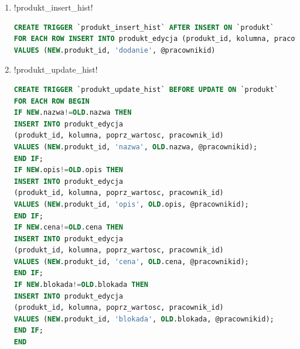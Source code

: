 \begin{enumerate}
\item \s!produkt_insert_hist!
\begin{lstlisting}[language=SQL]
CREATE TRIGGER `produkt_insert_hist` AFTER INSERT ON `produkt`
FOR EACH ROW INSERT INTO produkt_edycja (produkt_id, kolumna, pracownik_id)
VALUES (NEW.produkt_id, 'dodanie', @pracownikid)
\end{lstlisting}
\item \s!produkt_update_hist!
\begin{lstlisting}[language=SQL]
CREATE TRIGGER `produkt_update_hist` BEFORE UPDATE ON `produkt`
FOR EACH ROW BEGIN
IF NEW.nazwa!=OLD.nazwa THEN
INSERT INTO produkt_edycja 
(produkt_id, kolumna, poprz_wartosc, pracownik_id)
VALUES (NEW.produkt_id, 'nazwa', OLD.nazwa, @pracownikid);
END IF;
IF NEW.opis!=OLD.opis THEN
INSERT INTO produkt_edycja 
(produkt_id, kolumna, poprz_wartosc, pracownik_id)
VALUES (NEW.produkt_id, 'opis', OLD.opis, @pracownikid);
END IF;
IF NEW.cena!=OLD.cena THEN
INSERT INTO produkt_edycja 
(produkt_id, kolumna, poprz_wartosc, pracownik_id)
VALUES (NEW.produkt_id, 'cena', OLD.cena, @pracownikid);
END IF;
IF NEW.blokada!=OLD.blokada THEN
INSERT INTO produkt_edycja 
(produkt_id, kolumna, poprz_wartosc, pracownik_id)
VALUES (NEW.produkt_id, 'blokada', OLD.blokada, @pracownikid);
END IF;
END
\end{lstlisting}
\end{enumerate}
